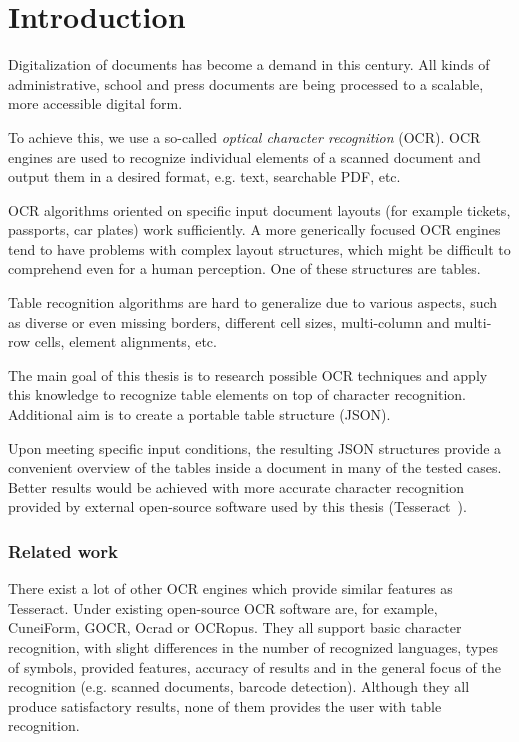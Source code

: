 \chapter*{Introduction}

Digitalization of documents has become a demand in this century. All kinds of administrative, school and press documents are being processed to a scalable, more accessible digital form. 

To achieve this, we use a so-called \emph{optical character recognition} (OCR). OCR engines are used to recognize individual elements of a scanned document and output them in a desired format, e.g. text, searchable PDF, etc.

OCR algorithms oriented on specific input document layouts (for example tickets, passports, car plates) work sufficiently. A more generically focused OCR engines tend to have problems with complex layout structures, which might be difficult to comprehend even for a human perception. One of these structures are tables.

Table recognition algorithms are hard to generalize due to various aspects, such as diverse or even missing borders, different cell sizes, multi-column and multi-row cells, element alignments, etc. 

The main goal of this thesis is to research possible OCR techniques and apply this knowledge to recognize table elements on top of character recognition. Additional aim is to create a portable table structure (JSON).

Upon meeting specific input conditions, the resulting JSON structures provide a convenient overview of the tables inside a document in many of the tested cases. Better results would be achieved with more accurate character recognition provided by external open-source software used by this thesis (Tesseract~\cite{TesseractGIT}).

\subsection*{Related work}

There exist a lot of other OCR engines which provide similar features as Tesseract. Under existing open-source OCR software are, for example, CuneiForm, GOCR, Ocrad or OCRopus. They all support basic character recognition, with slight differences in the number of recognized languages, types of symbols, provided features, accuracy of results and in the general focus of the recognition (e.g. scanned documents, barcode detection). Although they all produce satisfactory results, none of them provides the user with table recognition.

